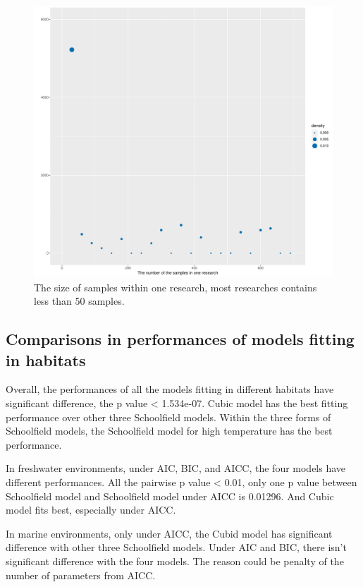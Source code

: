 \documentclass[11pt]{article}
\begin{document}
		\begin{figure}[H]
		\centering
		\includegraphics[width = \textwidth]{../Results/number.pdf}
		\caption{The size of samples within one research, most researches contains less than 50 samples.}
	\end{figure}

	\subsection{Comparisons in performances of models fitting in habitats}
	Overall, the performances of all the models fitting in different habitats have significant difference, the p value < 1.534e-07. Cubic model has the best fitting performance over other three Schoolfield models. Within the three forms of Schoolfield models, the Schoolfield model for high temperature has the best performance.
	
	In freshwater environments, under AIC, BIC, and AICC, the four models have different performances. All the pairwise p value < 0.01, only one p value between Schoolfield model and Schoolfield model under AICC is 0.01296. And Cubic model fits best, especially under AICC.
	
	In marine environments, only under AICC, the Cubid model has significant difference with other three Schoolfield models. Under AIC and BIC, there isn't significant difference with the four models. The reason could be penalty of the number of parameters from AICC\citep{johnson2004model}.
	
\end{document}
